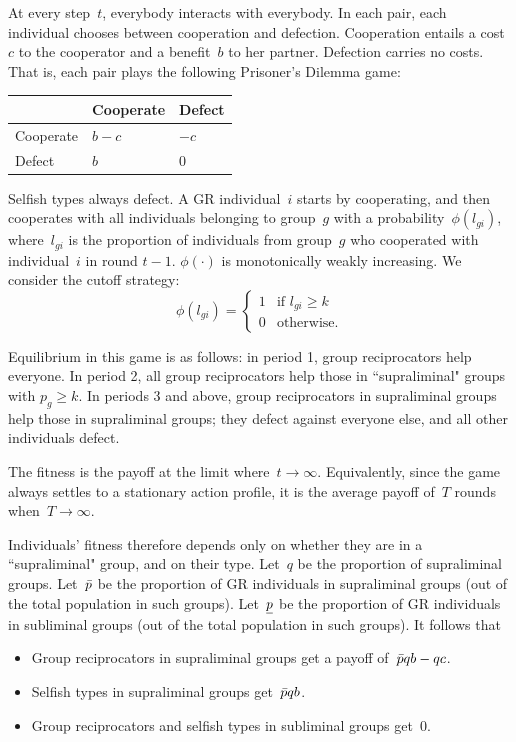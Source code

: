\documentclass[12pt,a4paper]{article}
\begin{document}
At every step~$t$, everybody interacts with everybody. In each pair, each individual chooses between cooperation and defection. Cooperation entails a cost~$c$ to the cooperator and a benefit~$b$ to her partner. Defection carries no costs. That is, each pair plays the following Prisoner's Dilemma game:
\begin{center}
    \begin{tabularx}{0.5\textwidth}{|x|x|x|}
        \hline
        &   Cooperate   &   Defect  \\
        \hline
        Cooperate   &   $b-c$   &   $-c$    \\
        \hline
        Defect  &   $b$ &   $0$   \\
        \hline
    \end{tabularx}
\end{center}

Selfish types always defect. A GR individual~$i$ starts by cooperating, and then cooperates with all individuals belonging to group~$g$ with a probability~$\phi(l_{gi})$, where~$l_{gi}$ is the proportion of individuals from group~$g$ who cooperated with individual~$i$ in round $t-1$.
$\phi(\cdot)$ is monotonically weakly increasing. We consider the cutoff strategy: 
$$
    \phi(l_{gi}) =
    \begin{cases}
        1   &   \text{if } l_{gi} \geq k  \\
        0   &   \text{otherwise.}
    \end{cases}
$$

Equilibrium in this game is as follows: in period 1, group reciprocators help
everyone. In period 2, all group reciprocators help those in ``supraliminal"
groups with $p_g \geq k$. In periods 3 and above, group reciprocators in supraliminal
groups help those in supraliminal groups; they defect against everyone else,
and all other individuals defect.

The fitness is the payoff at the limit where~$t\to\infty$. Equivalently, since the game always settles to a stationary action profile, it is the average payoff of~$T$ rounds when~$T\to\infty$. 

%
Individuals' fitness therefore depends only on whether they are in a ``supraliminal" group, and on their type. Let~$q$ be the 
proportion of supraliminal groups. Let~$\bar{p}$ be the proportion of 
GR individuals in supraliminal groups (out of the total population in such groups). Let~$\underline{p}$ be the proportion of GR individuals in subliminal groups (out of the total population in such groups). It follows that
\begin{itemize}
    \item Group reciprocators in supraliminal groups get a payoff of~$\bar{p} qb - qc$.
    \item Selfish types in supraliminal groups get~$\bar{p} qb$.
    \item Group reciprocators and selfish types in subliminal groups get~$0$.
\end{itemize}
\end{document}
